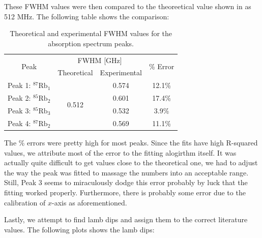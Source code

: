 \documentclass{article}
\begin{document}
These FWHM values were then compared to the theoreetical value shown in \cite{nakayama_1984_theoretical} as 512 MHz. The following table shows the comparison:

\begin{table}[h]
    \centering
    \begin{tabular}{|c|cc|c|}
    \hline
    \multirow{2}{*}{Peak}      & \multicolumn{2}{c|}{FWHM {[}GHz{]}}         & \multirow{2}{*}{\% Error} \\ \cline{2-3}
                               & \multicolumn{1}{c|}{Theoretical} & Experimental &        \\ \hline
    Peak 1: $^{87}\text{Rb}_1$ & \multicolumn{1}{c|}{\multirow{4}{*}{0.512}} & 0.574 & 12.1\%                    \\ \cline{1-1} \cline{3-4} 
    Peak 2: $^{85}\text{Rb}_2$ & \multicolumn{1}{c|}{}            & 0.601        & 17.4\% \\ \cline{1-1} \cline{3-4} 
    Peak 3: $^{85}\text{Rb}_3$ & \multicolumn{1}{c|}{}            & 0.532        & 3.9\%  \\ \cline{1-1} \cline{3-4} 
    Peak 4: $^{87}\text{Rb}_2$ & \multicolumn{1}{c|}{}            & 0.569        & 11.1\% \\ \hline
    \end{tabular}
    \caption{Theoretical and experimental FWHM values for the absorption spectrum peaks.}
    \label{tab:FWHM}
\end{table}

The \% errors were pretty high for most peaks. Since the fits have high R-squared values, we attribute most of the error to the fitting alogirthm itself.
It was actually quite difficult to get values close to the theoretical one, we had to adjust the way the peak was fitted to massage the numbers into an acceptable range. Still, Peak 3 seems to miraculously dodge this error probably by luck that the fitting worked properly. 
Furthermore, there is probably some error due to the calibration of $x$-axis as aforementioned. 

\pagebreak{}

Lastly, we attempt to find lamb dips and assign them to the correct literature values. The following plots shows the lamb dips:
\end{document}

